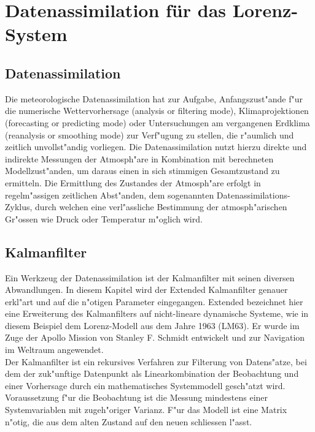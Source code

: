 %
%
%
\chapter{Datenassimilation für das Lorenz-System\label{chapter:kalman}}
\begin{refsection}

\section{Datenassimilation}
Die meteorologische Datenassimilation hat zur Aufgabe, Anfangszust"ande f"ur die numerische Wettervorhersage (analysis or filtering mode), Klimaprojektionen (forecasting or predicting mode) oder Untersuchungen am vergangenen Erdklima (reanalysis or smoothing mode) zur Verf"ugung zu stellen, die r"aumlich und zeitlich unvollst"andig vorliegen. Die Datenassimilation nutzt hierzu direkte und indirekte Messungen der Atmosph"are in Kombination mit berechneten Modellzust"anden, um daraus einen in sich stimmigen Gesamtzustand zu ermitteln. Die Ermittlung des Zustandes der Atmosph"are erfolgt in regelm"assigen zeitlichen Abst"anden, dem sogenannten Datenassimilations-Zyklus, durch welchen eine verl"assliche Bestimmung der atmosph"arischen Gr"ossen wie Druck oder Temperatur m"oglich wird.

\section{Kalmanfilter}
Ein Werkzeug der Datenassimilation ist der Kalmanfilter mit seinen diversen Abwandlungen. In diesem Kapitel wird der Extended Kalmanfilter genauer erkl"art und auf die n"otigen Parameter eingegangen. Extended bezeichnet hier eine Erweiterung des Kalmanfilters auf nicht-lineare dynamische Systeme, wie in diesem Beispiel dem Lorenz-Modell aus dem Jahre 1963 (LM63). Er wurde im Zuge der Apollo Mission von Stanley F. Schmidt entwickelt und zur Navigation im Weltraum angewendet.\\

Der Kalmanfilter ist ein rekursives Verfahren zur Filterung von Datens"atze, bei dem  der zuk"unftige Datenpunkt als Linearkombination der Beobachtung und einer Vorhersage durch ein mathematisches Systemmodell gesch"atzt wird. Voraussetzung f"ur die Beobachtung ist die Messung mindestens einer Systemvariablen mit zugeh"origer Varianz. F"ur das Modell ist eine Matrix n"otig, die aus dem alten Zustand auf den neuen schliessen l"asst.\\


\end{refsection}
